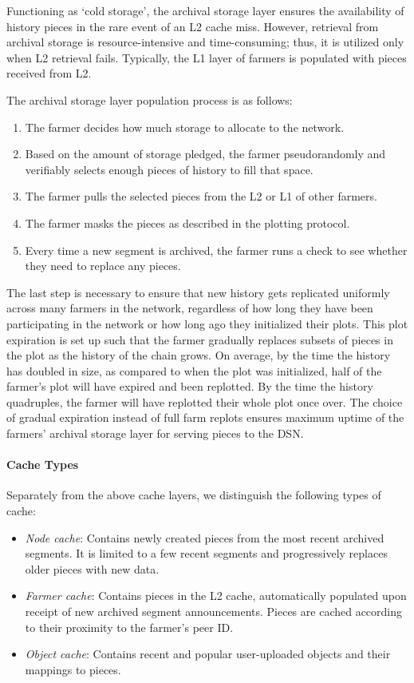 \documentclass[conference]{IEEEtran}
\begin{document}
Functioning as `cold storage', the archival storage layer ensures the availability of history pieces in the rare event of an L2 cache miss. However, retrieval from archival storage is resource-intensive and time-consuming; thus, it is utilized only when L2 retrieval fails. Typically, the L1 layer of farmers is populated with pieces received from L2.

The archival storage layer population process is as follows:

\begin{enumerate}
    \item The farmer decides how much storage to allocate to the network.
    \item Based on the amount of storage pledged, the farmer pseudorandomly and verifiably selects enough pieces of history to fill that space.
    \item The farmer pulls the selected pieces from the L2 or L1 of other farmers.
    \item The farmer masks the pieces as described in the plotting protocol.
    \item Every time a new segment is archived, the farmer runs a check to see whether they need to replace any pieces.
\end{enumerate}

The last step is necessary to ensure that new history gets replicated uniformly across many farmers in the network, regardless of how long they have been participating in the network or how long ago they initialized their plots. This plot expiration is set up such that the farmer gradually replaces subsets of pieces in the plot as the history of the chain grows. On average, by the time the history has doubled in size, as compared to when the plot was initialized, half of the farmer's plot will have expired and been replotted. By the time the history quadruples, the farmer will have replotted their whole plot once over. The choice of gradual expiration instead of full farm replots ensures maximum uptime of the farmers' archival storage layer for serving pieces to the DSN.

\paragraph{Cache Types}

Separately from the above cache layers, we distinguish the following types of cache:
\begin{itemize}
    \item \textit{Node cache}: Contains newly created pieces from the most recent archived segments. It is limited to a few recent segments and progressively replaces older pieces with new data.
    \item \textit{Farmer cache}: Contains pieces in the L2 cache, automatically populated upon receipt of new archived segment announcements. Pieces are cached according to their proximity to the farmer's peer ID.
    \item \textit{Object cache}: Contains recent and popular user-uploaded objects and their mappings to pieces.
\end{itemize}
\end{document}
